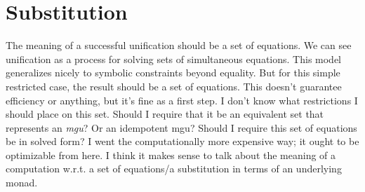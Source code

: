 \documentclass[11pt,twoside]{article}
\numberwithin{equation}{subsection} %
\begin{document}
\section{Substitution}

The meaning of a successful unification should be a set of
equations. We can see unification as a process for solving sets of
simultaneous equations. This model generalizes nicely to symbolic
constraints beyond equality. But for this simple restricted case, the
result should be a set of equations. This doesn't guarantee efficiency
or anything, but it's fine as a first step. I don't know what
restrictions I should place on this set. Should I require that it be
an equivalent set that represents an \emph{mgu}? Or an idempotent mgu?
Should I require this set of equations be in solved form? I went the
computationally more expensive way; it ought to be optimizable from
here. I think it makes sense to talk about the meaning of a
computation w.r.t. a set of equations/a substitution in terms of an
underlying monad.

\vspace{.5cm}
\end{document}
